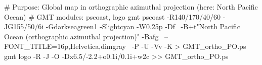 # Purpose: Global map in orthographic azimuthal projection (here: North Pacific Ocean)
# GMT modules: pscoast, logo
gmt pscoast -R140/170/40/60 -JG155/50/6i -Gdarkseagreen1 -Slightcyan -W0.25p -Df \
	-B+t"North Pacific Ocean (orthographic azimuthal projection)" -Bafg \
	--FONT_TITLE=16p,Helvetica,dimgray \
	-P -U -Vv -K > GMT_ortho_PO.ps
gmt logo -R -J -O -Dx6.5/-2.2+o0.1i/0.1i+w2c  >> GMT_ortho_PO.ps